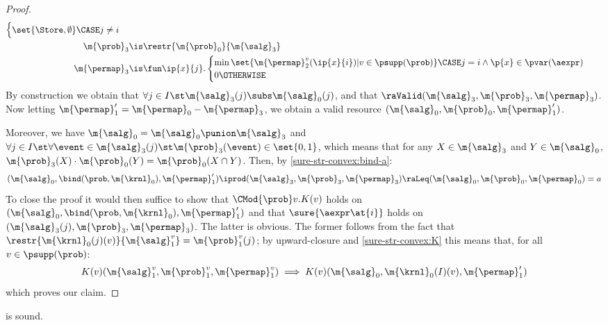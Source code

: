 \begin{proof}
\begin{align*}
\begin{cases}
        \set{\Store, \emptyset}
        \CASE j \ne i
      \end{cases}
    \\
    \m{\prob}_3 &\is \restr{\m{\prob}_0}{\m{\salg}_3}
    \\
    \m{\permap}_3 &\is
      \fun \ip{x}{j}.
      \begin{cases}
        \min
          \set{\m{\permap}^v_2(\ip{x}{i}) | v \in \psupp(\prob)}
        \CASE j=i \land \p{x} \in \pvar(\aexpr) \\
        0 \OTHERWISE
      \end{cases}
  \end{align*}
  By construction we obtain that
  $ \forall j\in I\st \m{\salg}_3(j) \subs \m{\salg}_0(j) $,
and that
  $\raValid(\m{\salg}_3, \m{\prob}_3, \m{\permap}_3)$.
Now letting
  $
   \m{\permap}_1' = {\m{\permap}_0-\m{\permap}_3}
  $,
  we obtain a valid resource
  $(\m{\salg}_0, \m{\prob}_0, \m{\permap}_1')$.


  Moreover,
  we have
  $
    \m{\salg}_0 = \m{\salg}_0 \punion \m{\salg}_3
  $
  and
  $
    \forall j\in I\st
    \forall\event\in\m{\salg}_3(j)\st
      \m{\prob}_3(\event)\in\set{0,1}
  $,
  which means that
  for any $X \in \m{\salg}_3$ and $Y \in \m{\salg}_0$,
  $\m{\prob}_3(X) \cdot \m{\prob}_0(Y) = \m{\prob}_0(X \cap Y)$.
  Then, by \eqref{sure-str-convex:bind-a}:
  \[
    (\m{\salg}_0, \bind(\prob, \m{\krnl}_0), \m{\permap}_1')
    \iprod
    (\m{\salg}_3, \m{\prob}_3, \m{\permap}_3)
    \raLeq
    (\m{\salg}_0, \m{\prob}_0, \m{\permap}_0) = a
  \]
  To close the proof it would then suffice to show that
  $ \CMod{\prob} v. K(v) $
  holds on
  $(\m{\salg}_0, \bind(\prob, \m{\krnl}_0), \m{\permap}_1')$
  and that
  $ \sure{\aexpr\at{i}} $
  holds on
  $ (\m{\salg}_3(j),\m{\prob}_3,\m{\permap}_3) $.
  The latter is obvious.
  The former follows from
  the fact that $ \restr{\m{\krnl}_0(j)(v)}{\m{\salg}^v_1} = \m{\prob}^v_1(j) $;
  by upward-closure and \eqref{sure-str-convex:K}
  this means that, for all $v \in \psupp(\prob)$:
  \[
    K(v)(\m{\salg}^v_1, \m{\prob}^v_1, \m{\permap}^v_1)
    \implies
    K(v)(\m{\salg}_0, \m{\krnl}_0(I)(v), \m{\permap}_1')
  \]
  which proves our claim.
\end{proof}
 \begin{lemma}
\label{proof:c-for-all}
   is sound.
\end{lemma}

